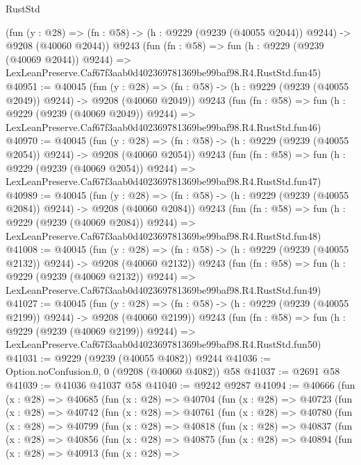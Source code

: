 \begin{lexlean}{RustStd}
\begin{coremodule}
    (fun (y : @28) =>
    (fn : @58) -> (h : @9229 (@9239 (@40055 @2044)) @9244) -> @9208 (@40060 @2044))
    @9243
    (fun (fn : @58) =>
    fun (h : @9229 (@9239 (@40069 @2044)) @9244) =>
    LexLeanPreserve.Caf67f3aab0d402369781369be99baf98.R4.RustStd.fun45)
@40951 := @40045
    (fun (y : @28) =>
    (fn : @58) -> (h : @9229 (@9239 (@40055 @2049)) @9244) -> @9208 (@40060 @2049))
    @9243
    (fun (fn : @58) =>
    fun (h : @9229 (@9239 (@40069 @2049)) @9244) =>
    LexLeanPreserve.Caf67f3aab0d402369781369be99baf98.R4.RustStd.fun46)
@40970 := @40045
    (fun (y : @28) =>
    (fn : @58) -> (h : @9229 (@9239 (@40055 @2054)) @9244) -> @9208 (@40060 @2054))
    @9243
    (fun (fn : @58) =>
    fun (h : @9229 (@9239 (@40069 @2054)) @9244) =>
    LexLeanPreserve.Caf67f3aab0d402369781369be99baf98.R4.RustStd.fun47)
@40989 := @40045
    (fun (y : @28) =>
    (fn : @58) -> (h : @9229 (@9239 (@40055 @2084)) @9244) -> @9208 (@40060 @2084))
    @9243
    (fun (fn : @58) =>
    fun (h : @9229 (@9239 (@40069 @2084)) @9244) =>
    LexLeanPreserve.Caf67f3aab0d402369781369be99baf98.R4.RustStd.fun48)
@41008 := @40045
    (fun (y : @28) =>
    (fn : @58) -> (h : @9229 (@9239 (@40055 @2132)) @9244) -> @9208 (@40060 @2132))
    @9243
    (fun (fn : @58) =>
    fun (h : @9229 (@9239 (@40069 @2132)) @9244) =>
    LexLeanPreserve.Caf67f3aab0d402369781369be99baf98.R4.RustStd.fun49)
@41027 := @40045
    (fun (y : @28) =>
    (fn : @58) -> (h : @9229 (@9239 (@40055 @2199)) @9244) -> @9208 (@40060 @2199))
    @9243
    (fun (fn : @58) =>
    fun (h : @9229 (@9239 (@40069 @2199)) @9244) =>
    LexLeanPreserve.Caf67f3aab0d402369781369be99baf98.R4.RustStd.fun50)
@41031 := @9229 (@9239 (@40055 @4082)) @9244
@41036 := Option.noConfusion.{0, 0} (@9208 (@40060 @4082)) @58
@41037 := @2691 @58
@41039 := @41036 @41037 @58
@41040 := @9242 @9287
@41094 := @40666
    (fun (x : @28) =>
    @40685
      (fun (x : @28) =>
      @40704
        (fun (x : @28) =>
        @40723
          (fun (x : @28) =>
          @40742
            (fun (x : @28) =>
            @40761
              (fun (x : @28) =>
              @40780
                (fun (x : @28) =>
                @40799
                  (fun (x : @28) =>
                  @40818
                    (fun (x : @28) =>
                    @40837
                      (fun (x : @28) =>
                      @40856
                        (fun (x : @28) =>
                        @40875
                          (fun (x : @28) =>
                          @40894
                            (fun (x : @28) =>
                            @40913
                              (fun (x : @28) =>

\end{coremodule}
\end{lexlean}
